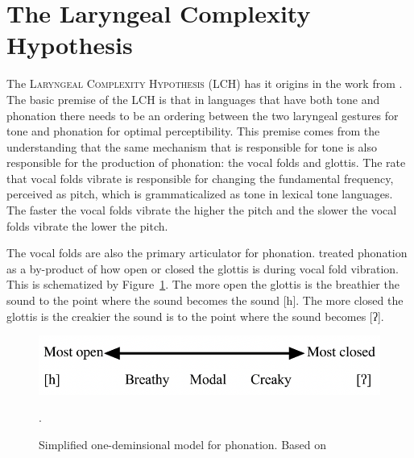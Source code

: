 \documentclass[12pt, letterpaper]{article}
\begin{document}
\section{The Laryngeal Complexity Hypothesis} \label{sec:Silverman}

The \textsc{Laryngeal Complexity Hypothesis} (LCH) has it origins in the work from \citet{silvermanLaryngealComplexityOtomanguean1997,blankenshipTimeCourseBreathiness1997,blankenshipTimingNonmodalPhonation2002}. The basic premise of the LCH is that in languages that have both tone and phonation there needs to be an ordering between the two laryngeal gestures for tone and phonation for optimal perceptibility. This premise comes from the understanding that the same mechanism that is responsible for tone is also responsible for the production of phonation: the vocal folds and glottis. The rate that vocal folds vibrate is responsible for changing the fundamental frequency, perceived as pitch, which is grammaticalized as tone in lexical tone languages. The faster the vocal folds vibrate the higher the pitch and the slower the vocal folds vibrate the lower the pitch. 

The vocal folds are also the primary articulator for phonation. \citet{ladefogedPreliminariesLinguisticPhonetics1971,gordonPhonationTypesCrosslinguistic2001} treated phonation as a by-product of how open or closed the glottis is during vocal fold vibration. This is schematized by Figure~\ref{fig:Phonation}. The more open the glottis is the breathier the sound to the point where the sound becomes the sound [h]. The more closed the glottis is the creakier the sound is to the point where the sound becomes [ʔ]. 
\begin{figure}[!ht]
	\centering
	\includegraphics[width=.6\textwidth]{../Phonation.png}
	\caption{Simplified one-deminsional model for phonation. Based on \citet{ladefogedPreliminariesLinguisticPhonetics1971,gordonPhonationTypesCrosslinguistic2001}}.
	\label{fig:Phonation}
\end{figure}
\vspace{-2ex}
\end{document}
